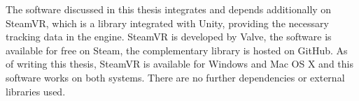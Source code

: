 The software discussed in this thesis integrates and depends additionally on 
SteamVR, which is a library integrated with Unity, providing the necessary 
tracking data in the engine. SteamVR is developed by Valve, the software is 
available for free on Steam, the complementary library is hosted on GitHub. As 
of writing this thesis, SteamVR is available for Windows and Mac OS X and this 
software works on both systems. 
\newline
There are no further dependencies or external libraries used.